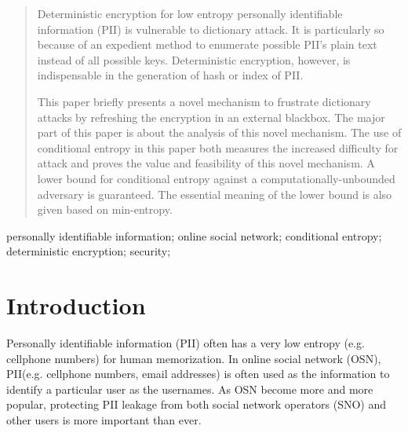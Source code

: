 \documentclass[10pt, conference, compsocconf]{IEEEtran}
\begin{document}




\maketitle


\begin{abstract}
    Deterministic encryption for low entropy personally identifiable information
    (PII) is vulnerable
    to dictionary attack. It is particularly so because
    of an expedient method to enumerate possible PII's
    plain text instead of all possible keys.
    Deterministic encryption, however,
    is indispensable in the generation of hash or index of PII.

    This paper briefly presents a novel mechanism
    to frustrate dictionary attacks
    by refreshing the encryption in an external blackbox.
    The major part of this paper is about the analysis
    of this novel mechanism.
    The use of conditional entropy in this paper both measures the increased
    difficulty for attack and proves the value and feasibility
    of this novel mechanism.
    A lower bound for conditional entropy
    against a computationally-unbounded adversary is guaranteed.
    The essential meaning of the lower bound is also
    given based on min-entropy.

\end{abstract}

\begin{IEEEkeywords}
personally identifiable information; online social network; conditional entropy; deterministic encryption;
security;

\end{IEEEkeywords}


%
\IEEEpeerreviewmaketitle



\section{Introduction}
    Personally identifiable information (PII) often has
    a very low entropy (e.g. cellphone numbers) for human memorization.
    In online social network (OSN), PII(e.g. cellphone numbers,
    email addresses) is often used as the information
    to identify a particular user as the usernames.
    As OSN become more and more popular,
    protecting PII leakage from both social network operators (SNO)
    and other users is more important than ever.
\end{document}
